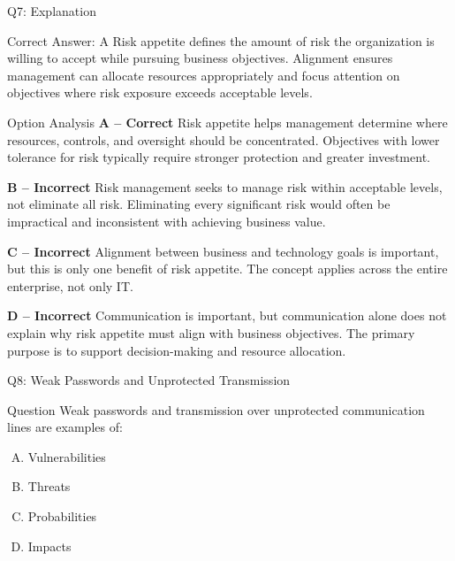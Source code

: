 \documentclass{beamer}
\begin{document}
	\begin{frame}[shrink=10]{Q7: Explanation}
		\footnotesize
		\begin{block}{Correct Answer: A}
			Risk appetite defines the amount of risk the organization is willing to accept while pursuing business objectives. Alignment ensures management can allocate resources appropriately and focus attention on objectives where risk exposure exceeds acceptable levels.
		\end{block}
		\begin{block}{Option Analysis}
			\textbf{A -- Correct} Risk appetite helps management determine where resources, controls, and oversight should be concentrated. Objectives with lower tolerance for risk typically require stronger protection and greater investment.
			

			\textbf{B -- Incorrect} Risk management seeks to manage risk within acceptable levels, not eliminate all risk. Eliminating every significant risk would often be impractical and inconsistent with achieving business value.
			

			\textbf{C -- Incorrect} Alignment between business and technology goals is important, but this is only one benefit of risk appetite. The concept applies across the entire enterprise, not only IT.
			

			\textbf{D -- Incorrect} Communication is important, but communication alone does not explain why risk appetite must align with business objectives. The primary purpose is to support decision-making and resource allocation.
		\end{block}
	\end{frame}

	
	\begin{frame}{Q8: Weak Passwords and Unprotected Transmission}
		\begin{block}{Question}
			Weak passwords and transmission over unprotected communication lines are examples of:
		\end{block}
		\begin{enumerate}[(A)]
			\item Vulnerabilities
			\item Threats
			\item Probabilities
			\item Impacts
		\end{enumerate}
	\end{frame}
	
\end{document}
